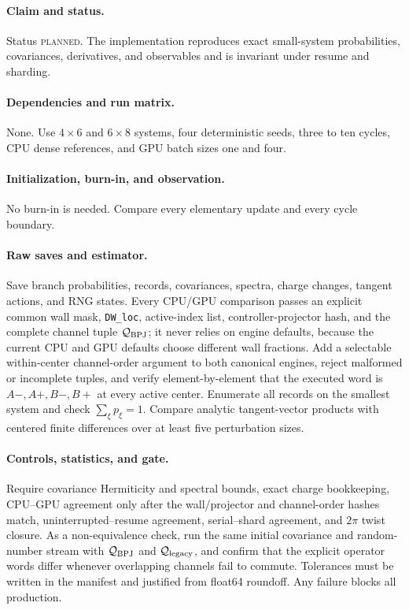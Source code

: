 \documentclass[aps,prx,onecolumn,nofootinbib,superscriptaddress,longbibliography]{revtex4-2}
\newcommand{\code}[1]{\texttt{#1}}
\newcommand{\planned}{\textsc{planned}}
\begin{document}
\paragraph{Claim and status.}
Status \planned.  The implementation reproduces exact small-system probabilities,
covariances, derivatives, and observables and is invariant under resume and sharding.

\paragraph{Dependencies and run matrix.}
None.  Use $4\times6$ and $6\times8$ systems, four deterministic seeds, three to ten cycles,
CPU dense references, and GPU batch sizes one and four.

\paragraph{Initialization, burn-in, and observation.}
No burn-in is needed.  Compare every elementary update and every cycle boundary.

\paragraph{Raw saves and estimator.}
Save branch probabilities, records, covariances, spectra, charge changes, tangent actions,
and RNG states.  Every CPU/GPU comparison passes an explicit common wall mask,
\code{DW\_loc}, active-index list, controller-projector hash, and the complete channel tuple
\(\mathcal Q_{\rm BPJ}\); it never relies on engine defaults, because the current CPU and GPU
defaults choose different wall fractions.  Add a selectable within-center channel-order
argument to both canonical engines, reject malformed or incomplete tuples, and verify
element-by-element that the executed word is \(A-,A+,B-,B+\) at every active center.
Enumerate all records on the smallest system and check
$\sum_\xi p_\xi=1$.  Compare analytic tangent-vector products with centered finite
differences over at least five perturbation sizes.

\paragraph{Controls, statistics, and gate.}
Require covariance Hermiticity and spectral bounds, exact charge bookkeeping, CPU--GPU
agreement only after the wall/projector and channel-order hashes match,
uninterrupted--resume agreement, serial--shard agreement, and $2\pi$ twist closure.
As a non-equivalence check, run the same initial covariance and random-number stream with
\(\mathcal Q_{\rm BPJ}\) and \(\mathcal Q_{\rm legacy}\), and confirm that the explicit
operator words differ whenever overlapping channels fail to commute.  Tolerances must be
written in the manifest and justified from float64 roundoff.  Any failure blocks all
production.
\end{document}
